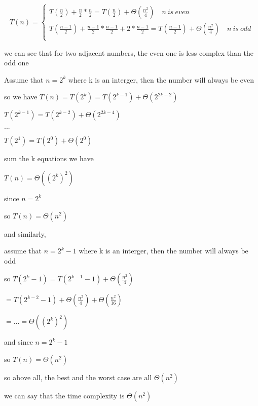 \begin{parts}
\begin{solution}
    \begin{equation}
      T(n)=\left\{
        \begin{aligned}
          T(\frac{n}{2})+\frac{n}{2}*\frac{n}{2}=T(\frac{n}{2})+\Theta(\frac{n^2}{4}) \quad n \ is \ even \\
          T(\frac{n-1}{2})+\frac{n-1}{2}*\frac{n-1}{2}+2*\frac{n-1}{2}=T(\frac{n-1}{2})+\Theta(\frac{n^2}{4}) \quad n \ is \  odd\\
        \end{aligned}
        \right
        .
      \end{equation}
      
    we can see that for two adjacent numbers, the even one is less complex than the odd one

    Assume that \(n=2^k\) where k is an interger, then the number will always be even
   
    so we have \(T(n)=T(2^k)=T(2^{k-1})+\Theta(2^{2k-2})\)

    \(T(2^{k-1})=T(2^{k-2})+\Theta(2^{2k-4})\)

    \(...\)

    \(T(2^1)=T(2^0)+\Theta(2^0)\)

    sum the k equations we have

    \(T(n)=\Theta((2^k)^2)\)

    since \(n=2^k\)

    so \(T(n)=\Theta(n^2)\)

    and similarly,
    
    assume that \(n=2^k-1\) where k is an interger, then the number will always be odd
    
    so \(T(2^k-1)=T(2^{k-1}-1)+\Theta(\frac{n^2}{4})\)
    
    \(=T(2^{k-2}-1)+\Theta(\frac{n^2}{4})+\Theta(\frac{n^2}{16})\)
    
    \(=...=\Theta((2^k)^2)\)

    and since \(n=2^k-1\)

    so \(T(n)=\Theta(n^2)\)

    so above all, the best and the worst case are all \(\Theta(n^2)\)
  
    we can say that the time complexity is  \( \Theta(n^2)\)
	\end{solution}

\end{parts}
